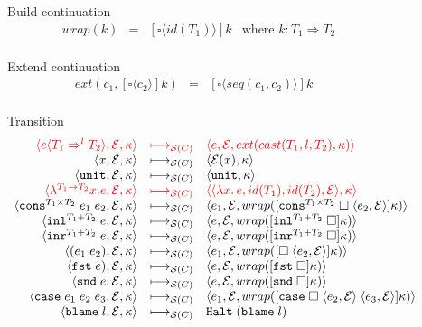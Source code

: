 \documentclass[acmsmall,review]{acmart}\settopmatter{printfolios=true,printccs=false,printacmref=false}
\newcommand{\funrule}[3]{#1 &=& #2 & #3\\}
\newcommand{\plus}[0]{+}
\newcommand{\sOOinspect}[3]{\langle#1,#2,#3\rangle}
\newcommand{\sOOreturn}[2]{\langle#1,#2\rangle}
\newcommand{\sOOhalt}[1]{\mathtt{Halt} \; #1}
\newcommand{\POOprod}[2]{#1 \times #2}
\newcommand{\POOsum}[2]{#1 \plus #2}
\newcommand{\eOOvar}[1]{#1}
\newcommand{\eOOsole}[0]{\mathtt{unit}}
\newcommand{\eOOlam}[4]{\lambda^{#1\rightarrow{}#2}#3.#4}
\newcommand{\eOOapp}[2]{(#1 \; #2)}
\newcommand{\eOOcons}[4]{\mathtt{cons}^{\POOprod{#1}{#2}} \; #3 \; #4}
\newcommand{\eOOcar}[1]{\mathtt{fst} \; #1}
\newcommand{\eOOcdr}[1]{\mathtt{snd} \; #1}
\newcommand{\eOOinl}[3]{\mathtt{inl}^{\POOsum{#1}{#2}} \; #3}
\newcommand{\eOOinr}[3]{\mathtt{inr}^{\POOsum{#1}{#2}} \; #3}
\newcommand{\eOOcase}[3]{\mathtt{case} \; #1 \; #2 \; #3}
\newcommand{\eOOcast}[4]{#1 \langle \cOOcast{#2}{#3}{#4} \rangle}
\newcommand{\eOOblame}[1]{\mathtt{blame} \; #1}
\newcommand{\cOOcast}[3]{#1 \Rightarrow^{#2} #3}
\newcommand{\oOOblame}[1]{\mathtt{blame} \; #1}
\newcommand{\kOOconsI}[5]{
	[\mathtt{cons}^{\POOprod{#1}{#2}} \; \square \; \langle#3,#4\rangle ]#5}
\newcommand{\kOOinl}[3]{[\mathtt{inl}^{\POOsum{#1}{#2}}\; \square]#3}
\newcommand{\kOOinr}[3]{[\mathtt{inr}^{\POOsum{#1}{#2}}\; \square]#3}
\newcommand{\kOOappI}[3]{
  [\square \; \langle#1,#2\rangle]#3
}
\newcommand{\kOOcar}[1]{[\mathtt{fst} \; \square]#1}
\newcommand{\kOOcdr}[1]{[\mathtt{snd} \; \square]#1}
\newcommand{\kOOcaseI}[4]{
  [\mathtt{case} \; \square \; \langle#1,#3\rangle \; \langle#2,#3\rangle ]#4}
\newcommand{\kOOcast}[2]{
  [\square \langle #1 \rangle]#2}
\newcommand{\hcvOOfun}[5]{\langle \lambda #3.\, #4 , #1 , #5, #2 \rangle}
\newcommand{\hcvOOtt}[0]{\mathtt{unit}}
\newcommand{\judgeSreduce}[3]{#2 \longmapsto_{\mathcal{S}(#1)} #3}
\newcommand{\redruleS}[3]{#1 & \longmapsto_{\mathcal{S}(C)} & #2 & #3\\}
\newcommand{\hiredruleS}[3]{\highlight{#1} & 
\highlight{\longmapsto_{\mathcal{S}(C)}} & \highlight{#2} & \highlight{#3} \\}
\newcommand{\highlight}[1]{{\color{red} #1}}
\begin{document}
\begin{figure} 
  Build continuation 
  \[
  \begin{array}{rclc}
  \funrule{wrap(k)}{\kOOcast{id(T_1)}{k}}{
  	\text{where } k : T_1 \Longrightarrow T_2}
  \end{array}
  \]
  
  Extend continuation 
  \[
  \begin{array}{rclc}
  \funrule{ext(c_1,\kOOcast{c_2}{k})}{
    \kOOcast{seq(c_1,c_2)}{k}
  }{}
  \end{array}
  \]

  Transition \fbox{$\judgeSreduce{C}{s}{s}$}
  \[
  \begin{array}{rclr}
  \hiredruleS{
    \sOOinspect{\eOOcast{e}{T_1}{l}{T_2}}{\mathcal{E}}{\kappa}
  }{
    \sOOinspect{e}{\mathcal{E}}{ext(cast(T_1,l,T_2),\kappa)}
  }{}
  \redruleS{
    \sOOinspect{\eOOvar{x}}{\mathcal{E}}{\kappa}
  }{  
    \sOOreturn{\mathcal{E}(x)}{\kappa}
  }{}
  \redruleS{
    \sOOinspect{\eOOsole}{\mathcal{E}}{\kappa}
  }{
    \sOOreturn{\hcvOOtt}{\kappa}
  }{}
  \hiredruleS{
    \sOOinspect{\eOOlam{T_1}{T_2}{x}{e}}{\mathcal{E}}{\kappa}
  }{
    \sOOreturn{\hcvOOfun{id(T_1)}{\mathcal{E}}{x}{e}{id(T_2)}}{\kappa}
  }{}
  \redruleS{
    \sOOinspect{\eOOcons{T_1}{T_2}{e_1}{e_2}}{\mathcal{E}}{\kappa}
  }{
    \sOOinspect{e_1}{\mathcal{E}}{
      wrap(\kOOconsI{T_1}{T_2}{e_2}{\mathcal{E}}{\kappa})
    }
  }{}
  \redruleS{
    \sOOinspect{\eOOinl{T_1}{T_2}{e}}{\mathcal{E}}{\kappa}
  }{
    \sOOinspect{e}{\mathcal{E}}{wrap(\kOOinl{T_1}{T_2}{\kappa})}
  }{}
  \redruleS{
    \sOOinspect{\eOOinr{T_1}{T_2}{e}}{\mathcal{E}}{\kappa}
  }{
    \sOOinspect{e}{\mathcal{E}}{wrap(\kOOinr{T_1}{T_2}{\kappa})}
  }{}
  \redruleS{
    \sOOinspect{\eOOapp{e_1}{e_2}}{\mathcal{E}}{\kappa}
  }{
    \sOOinspect{e_1}{\mathcal{E}}{wrap(\kOOappI{e_2}{\mathcal{E}}{\kappa})}}{}
  
  \redruleS{
    \sOOinspect{\eOOcar{e})}{\mathcal{E}}{\kappa}}{
    \sOOinspect{e}{\mathcal{E}}{wrap(\kOOcar{\kappa})}}{}
  
  \redruleS{
    \sOOinspect{\eOOcdr{e}}{\mathcal{E}}{\kappa}}{
    \sOOinspect{e}{\mathcal{E}}{wrap(\kOOcdr{\kappa})}}{}
  
  \redruleS{
    \sOOinspect{\eOOcase{e_1}{e_2}{e_3}}{\mathcal{E}}{\kappa}}{
    \sOOinspect{e_1}{\mathcal{E}}{wrap(\kOOcaseI{e_2}{e_3}{\mathcal{E}}{\kappa})}}{}


\redruleS{
	\sOOinspect{\eOOblame{l}}{\mathcal{E}}{\kappa}}{
	\sOOhalt{(\oOOblame{l})}}{}


\end{array}\]
\end{figure}
\end{document}
